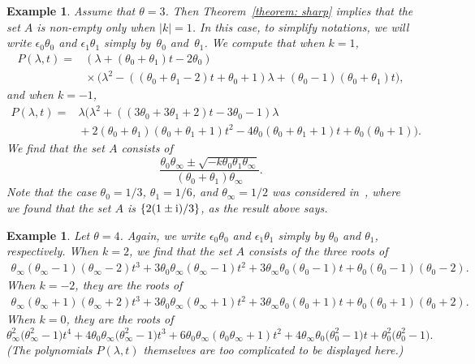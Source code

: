 \documentclass[10pt,a4paper]{amsart}
\numberwithin{equation}{section}
\newtheorem{Example}[Theorem]{Example}
\begin{document}
\begin{Example}\label{example2} Assume that $\theta=3$. Then Theorem~\ref{theorem: sharp} implies that the set $A$ is non-empty
 only when $|k|=1$. In this case,
 to simplify notations, we will write $\epsilon_0\theta_0$ and
 $\epsilon_1\theta_1$ simply by~$\theta_0$ and~$\theta_1$. We compute
 that when $k=1$,
 \begin{align*}
 P(\lambda,t)={}&(\lambda+(\theta_0+\theta_1)t-2\theta_0) \\
 &{}\times\bigl(\lambda^2-((\theta_0+\theta_1-2)t+\theta_0+1)\lambda
 +(\theta_0-1)(\theta_0+\theta_1)t\bigr),
 \end{align*}
 and when $k=-1$,
 \begin{align*}
 P(\lambda,t)={}&\lambda\bigl(\lambda^2+((3\theta_0+3\theta_1+2)t
 -3\theta_0-1)\lambda \\
 &{}+2(\theta_0+\theta_1)(\theta_0+\theta_1+1)t^2
 -4\theta_0(\theta_0+\theta_1+1)t+\theta_0(\theta_0+1)\bigr).
 \end{align*}
 We find that the set $A$ consists of
\[
 \frac{\theta_0\theta_\infty
 \pm\sqrt{-k\theta_0\theta_1\theta_\infty}}
 {(\theta_0+\theta_1)\theta_\infty}.
\]
 Note that the case $\theta_0=1/3$, $\theta_1=1/6$, and
 $\theta_\infty=1/2$ was considered in~\cite[Example~5.6]{Chen-Lin-Yang}, where we found that the set $A$ is $\{2(1\pm
{\rm i})/3\}$, as the result above says.
\end{Example}

\begin{Example} Let $\theta=4$. Again, we write $\epsilon_0\theta_0$
 and $\epsilon_1\theta_1$ simply by $\theta_0$ and $\theta_1$,
 respectively. When $k=2$, we find that the set
 $A$ consists of the three roots of
 \begin{equation*}
 \begin{split}
 \theta_\infty(\theta_\infty-1)(\theta_\infty-2)t^3
 +3\theta_0\theta_\infty(\theta_\infty-1)t^2
 +3\theta_\infty\theta_0(\theta_0-1)t
 +\theta_0(\theta_0-1)(\theta_0-2).
 \end{split}
 \end{equation*}
 When $k=-2$, they are the roots of
 \begin{equation*}
 \begin{split}
 \theta_\infty(\theta_\infty+1)(\theta_\infty+2)t^3
 +3\theta_0\theta_\infty(\theta_\infty+1)t^2
 +3\theta_\infty\theta_0(\theta_0+1)t
 +\theta_0(\theta_0+1)(\theta_0+2).
 \end{split}
 \end{equation*}
 When $k=0$, they are the roots of
 $$
 \theta_\infty^2\bigl(\theta_\infty^2-1\bigr)t^4
 +4\theta_0\theta_\infty\bigl(\theta_\infty^2-1\bigr)t^3
 +6\theta_0\theta_\infty(\theta_0\theta_\infty+1)t^2
 +4\theta_\infty\theta_0\bigl(\theta_0^2-1\bigr)t
 +\theta_0^2\bigl(\theta_0^2-1\bigr).
 $$
 (The polynomials $P(\lambda,t)$ themselves are too complicated to be
 displayed here.)
\end{Example}
\end{document}
